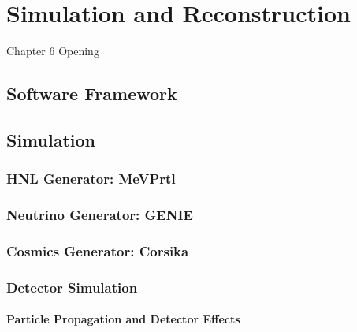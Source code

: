 
\chapter{Simulation and Reconstruction}

\ifpdf
    \graphicspath{{Chapter6/Figs/Raster/}{Chapter6/Figs/PDF/}{Chapter6/Figs/}}
\else
    \graphicspath{{Chapter6/Figs/Vector/}{Chapter6/Figs/}}
\fi


Chapter 6 Opening

\newpage

\section{Software Framework}

\section{Simulation}
\subsection{HNL Generator: MeVPrtl}
\subsection{Neutrino Generator: GENIE}
\subsection{Cosmics Generator: Corsika}
\subsection{Detector Simulation}
\subsubsection{Particle Propagation and Detector Effects}

